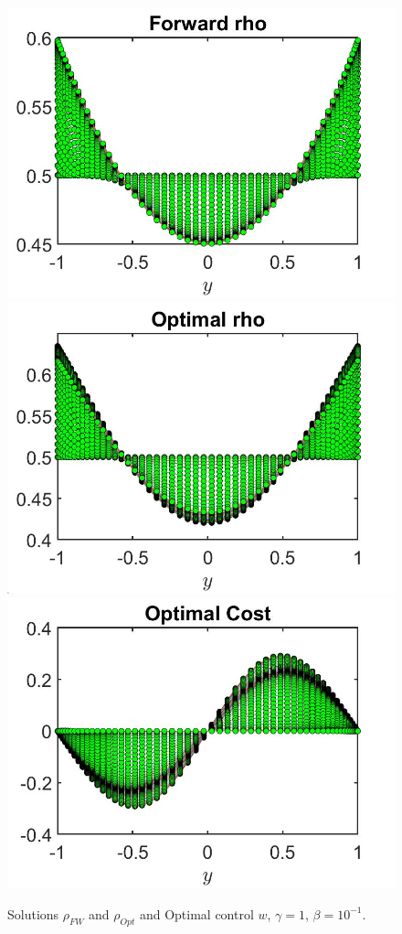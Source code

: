 \documentclass[11pt, a4paper]{article}
\theoremstyle{definition}
\begin{document}
\begin{figure}[h]
	\includegraphics[scale=0.3]{rhoFW01.jpg}
	\includegraphics[scale=0.3]{rhoOpt01.jpg}
	\includegraphics[scale=0.3]{wOpt01.jpg}
	\caption{Solutions $\rho_{FW}$ and $\rho_{Opt}$ and Optimal control $w$, $\gamma = 1$, $\beta = 10^{-1}$.}
	\label{rho01}
\end{figure}
\end{document}
